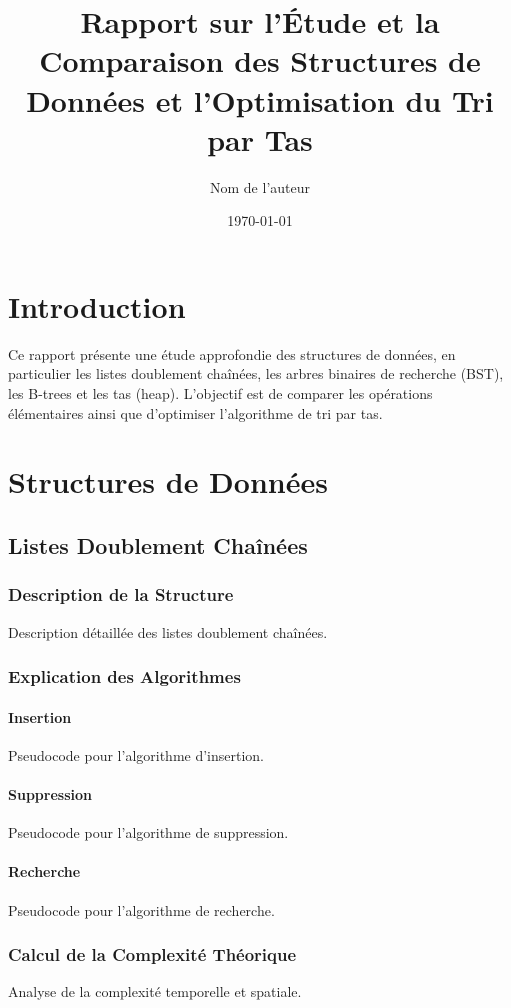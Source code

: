 \documentclass[a4paper, 12pt]{article}
\title{Rapport sur l'Étude et la Comparaison des Structures de Données et l'Optimisation du Tri par Tas}
\author{Nom de l'auteur}
\date{\today}
\begin{document}
\maketitle

\tableofcontents %
\newpage %
\section{Introduction}
Ce rapport présente une étude approfondie des structures de données, en particulier les listes doublement chaînées, les arbres binaires de recherche (BST), les B-trees et les tas (heap). L'objectif est de comparer les opérations élémentaires ainsi que d'optimiser l'algorithme de tri par tas.

\section{Structures de Données}
\subsection{Listes Doublement Chaînées}
\subsubsection{Description de la Structure}
Description détaillée des listes doublement chaînées.

\subsubsection{Explication des Algorithmes}
\paragraph{Insertion}
Pseudocode pour l'algorithme d'insertion.

\paragraph{Suppression}
Pseudocode pour l'algorithme de suppression.

\paragraph{Recherche}
Pseudocode pour l'algorithme de recherche.

\subsubsection{Calcul de la Complexité Théorique}
Analyse de la complexité temporelle et spatiale.
\end{document}

